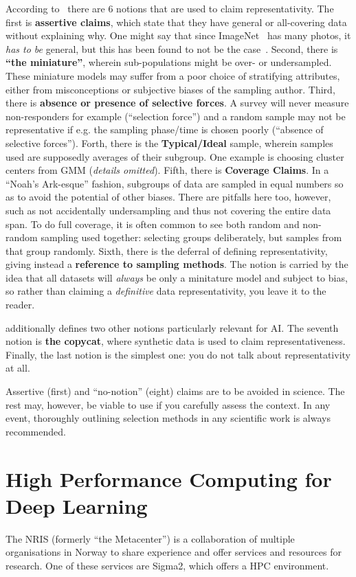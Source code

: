 \documentclass[10pt,twocolumn,letterpaper]{article}
\begin{document}
According to~\cite{krusk1,krusk2} there are 6 notions that are used to claim representativity.
The first is \textbf{assertive claims}, which state that they have general or all-covering data without explaining why. One might say that since ImageNet~\cite{imageNet} has many photos, it \textit{has to be} general, but this has been found to not be the case~\cite{biasedImagenet}.
Second, there is \textbf{``the miniature''}, wherein sub-populations might be over- or undersampled. These miniature models may suffer from a poor choice of stratifying attributes, either from misconceptions or subjective biases of the sampling author.
Third, there is \textbf{absence or presence of selective forces}. A survey will never measure non-responders for example (``selection force'') and a random sample may not be representative if e.g. the sampling phase/time is chosen poorly (``absence of selective forces'').
Forth, there is the \textbf{Typical/Ideal} sample, wherein samples used are supposedly averages of their subgroup. One example is choosing cluster centers from \gls{GMM} (\textit{details omitted}).
Fifth, there is \textbf{Coverage Claims}. In a ``Noah's Ark-esque'' fashion, subgroups of data are sampled in equal numbers so as to avoid the potential of other biases. There are pitfalls here too, however, such as not accidentally undersampling and thus not covering the entire data span. To do full coverage, it is often common to see both random and non-random sampling used together: selecting groups deliberately, but samples from that group randomly.
Sixth, there is the deferral of defining representativity, giving instead a \textbf{reference to sampling methods}. The notion is carried by the idea that all datasets will \textit{always} be only a minitature model and subject to bias, so rather than claiming a \textit{definitive} data representativity, you leave it to the reader. 

\cite{datarepresentativity} additionally defines two other notions particularly relevant for \gls{AI}. The seventh notion is \textbf{the copycat}, where synthetic data is used to claim representativeness. Finally, the last notion is the simplest one: you do not talk about representativity at all. 

Assertive (first) and ``no-notion'' (eight) claims are to be avoided in science. The rest may, however, be viable to use if you carefully assess the context. In any event, thoroughly outlining selection methods in any scientific work is always recommended.

\section{High Performance Computing for Deep Learning}\label{sec:hpc}
The \gls{NRIS} (formerly ``the Metacenter'') is a collaboration of multiple organisations in Norway to share experience and offer services and resources for research. One of these services are Sigma2, which offers a \gls{HPC} environment.
\end{document}
